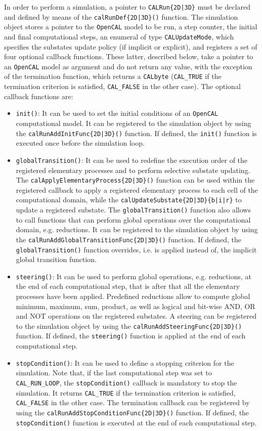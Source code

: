 In order to perform a simulation, a pointer to \verb'CALRun{2D|3D}'
must be declared and defined by means of the
\verb'calRunDef{2D|3D}()' function. The simulation object stores a
pointer to the \texttt{OpenCAL} model to be run, a step counter, the initial
and final computational steps, an enumeral of type
\verb'CALUpdateMode', which specifies the substates update policy
(if implicit or explicit), and registers a set of four optional
callback functions. These latter, described below, take a pointer to
an \texttt{OpenCAL} model as argument and do not return any value, with the
exception of the termination function, which returns a
\verb'CALbyte' (\verb'CAL_TRUE' if the termination criterion is
satisfied, \verb'CAL_FALSE' in the other case). The optional
callback functions are:
\begin{itemize}
	\item \verb'init()': It can be used to set the initial conditions of
	an \texttt{OpenCAL} computational model. It can be registered to the
	simulation object by using the \verb'calRunAddInitFunc{2D|3D}()'
	function. If defined, the \verb'init()' function is executed once
	before the simulation loop.
	\item \verb'globalTransition()': It can be used to redefine the
	execution order of the registered elementary processes and to
	perform selective substate updating. The
	\verb'calApplyElementaryProcess{2D|3D}()' function can be used
	within the registered callback to apply a registered elementary
	process to each cell of the computational domain, while the
	\verb'calUpdateSubstate{2D|3D}{b|i|r}' to update a registered
	substate. The \verb'globalTransition()' function also allows to
	call functions that can perform global operations over the
	computational domain, e.g. reductions. It can be registered to the
	simulation object by using the
	\verb'calRunAddGlobalTransitionFunc{2D|3D}()' function. If
	defined, the \verb'globalTransition()' function overrides, i.e. is
	applied instead of, the implicit global transition function.
	\item \verb'steering()': It can be used to perform global
	operations, e.g. reductions, at the end of each computational
	step, that is after that all the elementary processes have been
	applied. Predefined reductions allow to compute global minimum,
	maximum, sum, product, as well as logical and bit-wise AND, OR and
	NOT operations on the registered substates. A steering can be
	registered to the simulation object by using the
	\verb'calRunAddSteeringFunc{2D|3D}()' function. If defined, the
	\verb'steering()' function is applied at the end of each
	computational step.
	\item \verb'stopCondition()': It can be used to define a stopping
	criterion for the simulation. Note that, if the last computational
	step was set to \verb'CAL_RUN_LOOP', the \verb'stopCondition()'
	callback is mandatory to stop the simulation. It returns
	\verb'CAL_TRUE' if the termination criterion is satisfied,
	\verb'CAL_FALSE' in the other case. The termination callback can
	be registered by using the
	\verb'calRunAddStopConditionFunc{2D|3D}()' function. If defined,
	the \verb'stopCondition()' function is executed at the end of each
	computational step.
\end{itemize}

